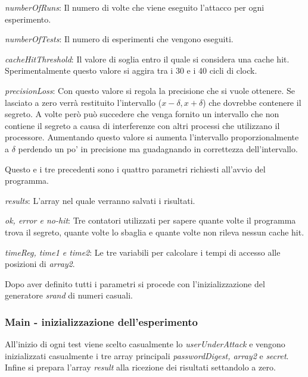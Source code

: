 					\emph{numberOfRuns}: Il numero di volte che viene eseguito l'attacco per ogni esperimento.
					
					\emph{numberOfTests}: Il numero di esperimenti che vengono eseguiti.
					
					\emph{cacheHitThreshold}: Il valore di soglia entro il quale si considera una cache hit. Sperimentalmente questo valore si aggira tra i 30 e i 40 cicli di clock.
					
					\emph{precisionLoss}: Con questo valore si regola la precisione che si vuole ottenere. Se lasciato a zero verrà restituito l'intervallo ($x-\delta, x+\delta$) che dovrebbe contenere il segreto. A volte però può succedere che venga fornito un intervallo che non contiene il segreto a causa di interferenze con altri processi che utilizzano il processore. Aumentando questo valore si aumenta l'intervallo proporzionalmente a $\delta$ perdendo un po' in precisione ma guadagnando in correttezza dell'intervallo.
					
					Questo e i tre precedenti sono i quattro parametri richiesti all'avvio del programma.
					
					\emph{results}: L'array nel quale verranno salvati i risultati.
					
					\emph{ok, error e no-hit}: Tre contatori utilizzati per sapere quante volte il programma trova il segreto, quante volte lo sbaglia e quante volte non rileva nessun cache hit.
					
					\emph{timeReg, time1 e time2}: Le tre variabili per calcolare i tempi di accesso alle posizioni di \emph{array2}.
			
				Dopo aver definito tutti i parametri si procede con l'inizializzazione del generatore \emph{srand} di numeri casuali.
				
				\subsubsection{Main - inizializzazione dell'esperimento}
				
				All'inizio di ogni test viene scelto casualmente lo \emph{userUnderAttack} e vengono inizializzati casualmente i tre array principali \emph{passwordDigest, array2} e \emph{secret}. Infine si prepara l'array \emph{result} alla ricezione dei risultati settandolo a zero.